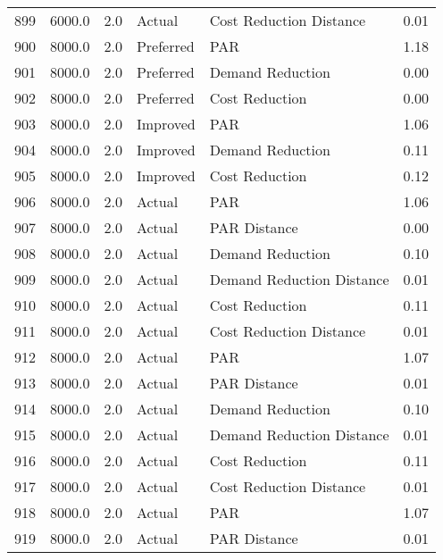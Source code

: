 \begin{longtable}{lrrllr}
899  &       6000.0 &     2.0 &         Actual &    Cost Reduction Distance &   0.01 \\
900  &       8000.0 &     2.0 &      Preferred &                        PAR &   1.18 \\
901  &       8000.0 &     2.0 &      Preferred &           Demand Reduction &   0.00 \\
902  &       8000.0 &     2.0 &      Preferred &             Cost Reduction &   0.00 \\
903  &       8000.0 &     2.0 &       Improved &                        PAR &   1.06 \\
904  &       8000.0 &     2.0 &       Improved &           Demand Reduction &   0.11 \\
905  &       8000.0 &     2.0 &       Improved &             Cost Reduction &   0.12 \\
906  &       8000.0 &     2.0 &         Actual &                        PAR &   1.06 \\
907  &       8000.0 &     2.0 &         Actual &               PAR Distance &   0.00 \\
908  &       8000.0 &     2.0 &         Actual &           Demand Reduction &   0.10 \\
909  &       8000.0 &     2.0 &         Actual &  Demand Reduction Distance &   0.01 \\
910  &       8000.0 &     2.0 &         Actual &             Cost Reduction &   0.11 \\
911  &       8000.0 &     2.0 &         Actual &    Cost Reduction Distance &   0.01 \\
912  &       8000.0 &     2.0 &         Actual &                        PAR &   1.07 \\
913  &       8000.0 &     2.0 &         Actual &               PAR Distance &   0.01 \\
914  &       8000.0 &     2.0 &         Actual &           Demand Reduction &   0.10 \\
915  &       8000.0 &     2.0 &         Actual &  Demand Reduction Distance &   0.01 \\
916  &       8000.0 &     2.0 &         Actual &             Cost Reduction &   0.11 \\
917  &       8000.0 &     2.0 &         Actual &    Cost Reduction Distance &   0.01 \\
918  &       8000.0 &     2.0 &         Actual &                        PAR &   1.07 \\
919  &       8000.0 &     2.0 &         Actual &               PAR Distance &   0.01 \\

\end{longtable}
